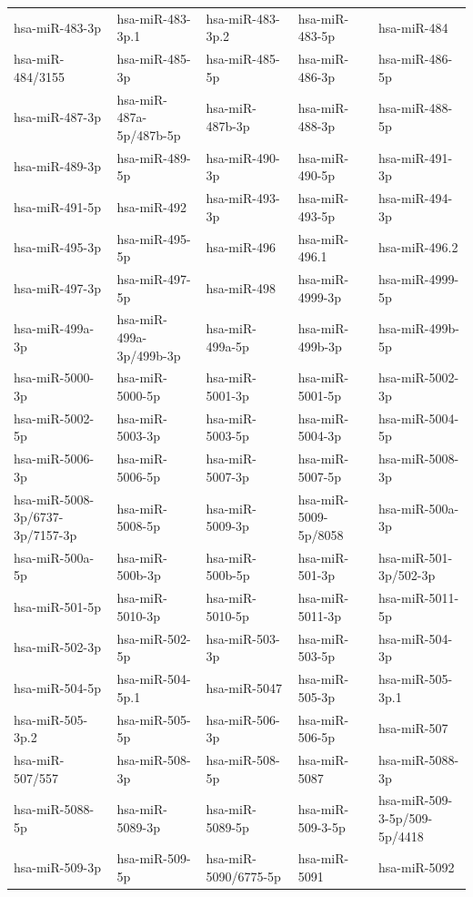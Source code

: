 \begin{longtable}{lllll}
hsa-miR-483-3p & hsa-miR-483-3p.1 & hsa-miR-483-3p.2 & hsa-miR-483-5p & hsa-miR-484 \\
hsa-miR-484/3155 & hsa-miR-485-3p & hsa-miR-485-5p & hsa-miR-486-3p & hsa-miR-486-5p \\
hsa-miR-487-3p & hsa-miR-487a-5p/487b-5p & hsa-miR-487b-3p & hsa-miR-488-3p & hsa-miR-488-5p \\
hsa-miR-489-3p & hsa-miR-489-5p & hsa-miR-490-3p & hsa-miR-490-5p & hsa-miR-491-3p \\
hsa-miR-491-5p & hsa-miR-492 & hsa-miR-493-3p & hsa-miR-493-5p & hsa-miR-494-3p \\
hsa-miR-495-3p & hsa-miR-495-5p & hsa-miR-496 & hsa-miR-496.1 & hsa-miR-496.2 \\
hsa-miR-497-3p & hsa-miR-497-5p & hsa-miR-498 & hsa-miR-4999-3p & hsa-miR-4999-5p \\
hsa-miR-499a-3p & hsa-miR-499a-3p/499b-3p & hsa-miR-499a-5p & hsa-miR-499b-3p & hsa-miR-499b-5p \\
hsa-miR-5000-3p & hsa-miR-5000-5p & hsa-miR-5001-3p & hsa-miR-5001-5p & hsa-miR-5002-3p \\
hsa-miR-5002-5p & hsa-miR-5003-3p & hsa-miR-5003-5p & hsa-miR-5004-3p & hsa-miR-5004-5p \\
hsa-miR-5006-3p & hsa-miR-5006-5p & hsa-miR-5007-3p & hsa-miR-5007-5p & hsa-miR-5008-3p \\
hsa-miR-5008-3p/6737-3p/7157-3p & hsa-miR-5008-5p & hsa-miR-5009-3p & hsa-miR-5009-5p/8058 & hsa-miR-500a-3p \\
hsa-miR-500a-5p & hsa-miR-500b-3p & hsa-miR-500b-5p & hsa-miR-501-3p & hsa-miR-501-3p/502-3p \\
hsa-miR-501-5p & hsa-miR-5010-3p & hsa-miR-5010-5p & hsa-miR-5011-3p & hsa-miR-5011-5p \\
hsa-miR-502-3p & hsa-miR-502-5p & hsa-miR-503-3p & hsa-miR-503-5p & hsa-miR-504-3p \\
hsa-miR-504-5p & hsa-miR-504-5p.1 & hsa-miR-5047 & hsa-miR-505-3p & hsa-miR-505-3p.1 \\
hsa-miR-505-3p.2 & hsa-miR-505-5p & hsa-miR-506-3p & hsa-miR-506-5p & hsa-miR-507 \\
hsa-miR-507/557 & hsa-miR-508-3p & hsa-miR-508-5p & hsa-miR-5087 & hsa-miR-5088-3p \\
hsa-miR-5088-5p & hsa-miR-5089-3p & hsa-miR-5089-5p & hsa-miR-509-3-5p & hsa-miR-509-3-5p/509-5p/4418 \\
hsa-miR-509-3p & hsa-miR-509-5p & hsa-miR-5090/6775-5p & hsa-miR-5091 & hsa-miR-5092 \\

\end{longtable}
